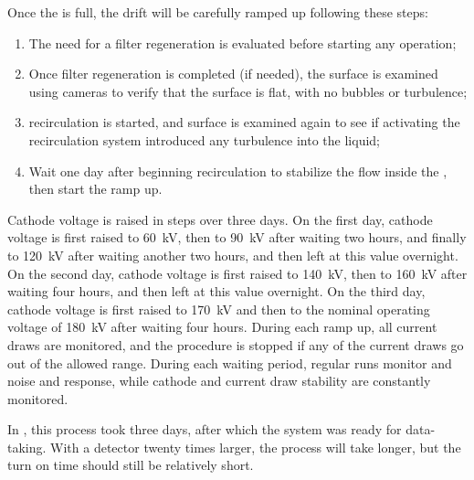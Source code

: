 Once the  is full, the drift  will be carefully ramped up following these steps:

\begin{enumerate}

    \item The need for a filter regeneration is evaluated before starting any operation;

    \item Once filter regeneration is completed (if needed), the  surface is examined using cameras to verify that the surface is flat, with no bubbles or turbulence;
    
    \item {} recirculation is started, and  surface is examined again to see if activating the recirculation system introduced any turbulence into the liquid;
    
    \item Wait one day after beginning  recirculation to stabilize the  flow inside the , then start the  ramp up.
    
\end{enumerate}

Cathode voltage is raised in steps over three days. 
On the first day, cathode voltage is first raised to \SI{60}{kV}, then to \SI{90}{kV} after waiting two hours, and finally to \SI{120}{kV} after waiting another two hours, and then left at this value overnight.
On the second day, cathode voltage is first raised to \SI{140}{kV}, then to \SI{160}{kV} after waiting four hours, and then left at this value overnight. 
On the third day, cathode voltage is first raised to \SI{170}{kV} and then to the nominal operating voltage of \SI{180}{kV} after waiting four hours. 
During each  ramp up, all  current draws are monitored, and the procedure is stopped if any of the current draws go out of the allowed range. 
During each waiting period, regular  runs monitor  and  noise and response, while cathode  and current draw stability are constantly monitored.

In , this process took three days, after which the system was  ready for data-taking. With a detector twenty times larger, the process will take longer, but the turn on time should still be relatively short. 


